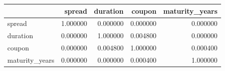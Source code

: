 \begin{tabular}{lrrrr}
\toprule
 & spread & duration & coupon & maturity_years \\
\midrule
spread & 1.000000 & 0.000000 & 0.000000 & 0.000000 \\
duration & 0.000000 & 1.000000 & 0.004800 & 0.000000 \\
coupon & 0.000000 & 0.004800 & 1.000000 & 0.000400 \\
maturity_years & 0.000000 & 0.000000 & 0.000400 & 1.000000 \\
\bottomrule
\end{tabular}
